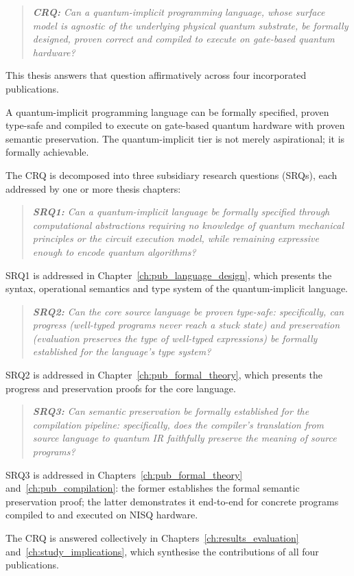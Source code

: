 \begin{quote}
    \textit{\textbf{CRQ: }Can a quantum-implicit programming language, whose surface model is agnostic of the underlying physical quantum substrate, be formally designed, proven correct and compiled to execute on gate-based quantum hardware?}
\end{quote}

This thesis answers that question affirmatively across four incorporated publications.

A quantum-implicit programming language can be formally specified, proven type-safe and compiled to execute on gate-based quantum hardware with proven semantic preservation.
The quantum-implicit tier is not merely aspirational; it is formally achievable.

The CRQ is decomposed into three subsidiary research questions (SRQs), each addressed by one or more thesis chapters:

\begin{quote}
    \textit{\textbf{SRQ1: }Can a quantum-implicit language be formally specified through computational abstractions requiring no knowledge of quantum mechanical principles or the circuit execution model, while remaining expressive enough to encode quantum algorithms?}
\end{quote}

SRQ1 is addressed in Chapter~\ref{ch:pub_language_design}, which presents the syntax, operational semantics and type system of the quantum-implicit language.

\begin{quote}
    \textit{\textbf{SRQ2: }Can the core source language be proven type-safe: specifically, can \emph{progress} (well-typed programs never reach a stuck state) and \emph{preservation} (evaluation preserves the type of well-typed expressions) be formally established for the language's type system?}
\end{quote}

SRQ2 is addressed in Chapter~\ref{ch:pub_formal_theory}, which presents the progress and preservation proofs for the core language.

\begin{quote}
    \textit{\textbf{SRQ3: }Can semantic preservation be formally established for the compilation pipeline: specifically, does the compiler's translation from source language to quantum IR faithfully preserve the meaning of source programs?}
\end{quote}

SRQ3 is addressed in Chapters~\ref{ch:pub_formal_theory} and~\ref{ch:pub_compilation}: the former establishes the formal semantic preservation proof; the latter demonstrates it end-to-end for concrete programs compiled to and executed on NISQ hardware.

The CRQ is answered collectively in Chapters~\ref{ch:results_evaluation} and~\ref{ch:study_implications}, which synthesise the contributions of all four publications.